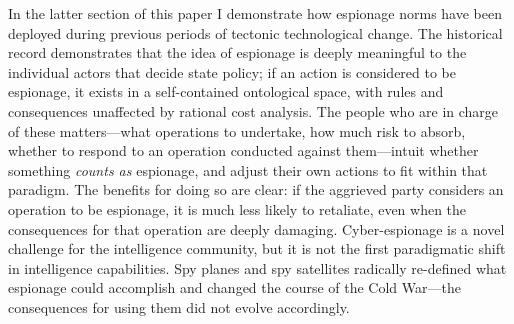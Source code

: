 \documentclass[12pt]{extarticle}
\begin{document}
In the latter section of this paper I demonstrate how espionage norms have been deployed during previous periods of tectonic technological change. The historical record demonstrates that the idea of espionage is deeply meaningful to the individual actors that decide state policy; if an action is considered to be espionage, it exists in a self-contained ontological space, with rules and consequences unaffected by rational cost analysis. The people who are in charge of these matters---what operations to undertake, how much risk to absorb, whether to respond to an operation conducted against them---intuit whether something \emph{counts as} espionage, and adjust their own actions to fit within that paradigm. The benefits for doing so are clear: if the aggrieved party considers an operation to be espionage, it is much less likely to retaliate, even when the consequences for that operation are deeply damaging. Cyber-espionage is a novel challenge for the intelligence community, but it is not the first paradigmatic shift in intelligence capabilities. Spy planes and spy satellites radically re-defined what espionage could accomplish and changed the course of the Cold War---the consequences for using them did not evolve accordingly.

\newpage


\end{document}
